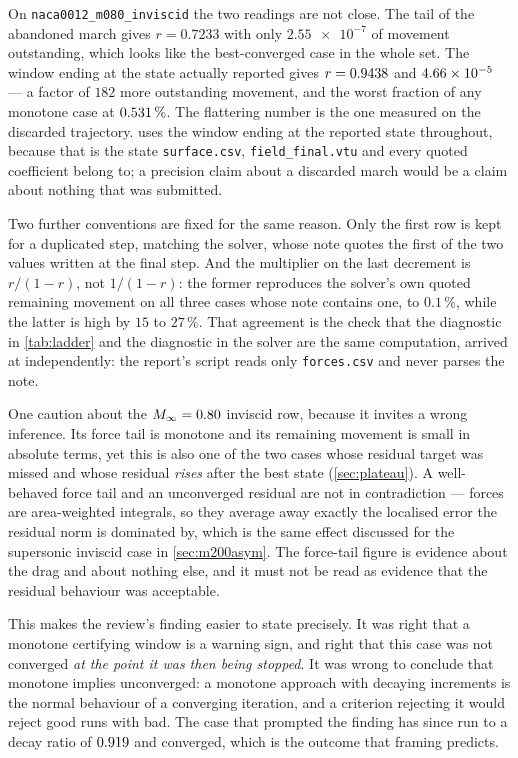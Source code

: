 On \texttt{naca0012\_m080\_inviscid} the two readings are not close. The tail of the
abandoned march gives $r=0.7233$ with only $\num{2.55e-7}$ of movement outstanding, which
looks like the best-converged case in the whole set. The window ending at the state actually
reported gives $r=\num{0.9438}$ and $\num{4.66e-05}$ --- a factor of
$182$ more outstanding movement, and the worst fraction of any monotone case at
$\num{0.531}\,\%$. The flattering number is the one measured on the
discarded trajectory.  uses the window ending at the reported state
throughout, because that is the state \texttt{surface.csv}, \texttt{field\_final.vtu} and every
quoted coefficient belong to; a precision claim about a discarded march would be a claim about
nothing that was submitted.

Two further conventions are fixed for the same reason. Only the first row is kept for a
duplicated step, matching the solver, whose note quotes the first of the two values written at
the final step. And the multiplier on the last decrement is $r/(1-r)$, not $1/(1-r)$: the
former reproduces the solver's own quoted remaining movement on all three cases whose note
contains one, to $0.1\,\%$, while the latter is high by $15$ to $27\,\%$. That agreement is
the check that the diagnostic in \cref{tab:ladder} and the diagnostic in the solver are the
same computation, arrived at independently: the report's script reads only \texttt{forces.csv}
and never parses the note.

One caution about the $M_\infty=0.80$ inviscid row, because it invites a wrong inference. Its
force tail is monotone and its remaining movement is small in absolute terms, yet this is also
one of the two cases whose residual target was missed and whose residual \emph{rises} after
the best state (\cref{sec:plateau}). A well-behaved force tail and an unconverged residual are
not in contradiction --- forces are area-weighted integrals, so they average away exactly the
localised error the residual norm is dominated by, which is the same effect discussed for the
supersonic inviscid case in \cref{sec:m200asym}. The force-tail figure is evidence about the
drag and about nothing else, and it must not be read as evidence that the residual behaviour
was acceptable.

This makes the review's finding easier to state precisely. It was right that a monotone
certifying window is a warning sign, and right that this case was not converged \emph{at the
point it was then being stopped}. It was wrong to conclude that monotone implies
unconverged: a monotone approach with decaying increments is the normal behaviour of a
converging iteration, and a criterion rejecting it would reject good runs with bad. The case
that prompted the finding has since run to a decay ratio of $\num{0.919}$ and
converged, which is the outcome that framing predicts.


